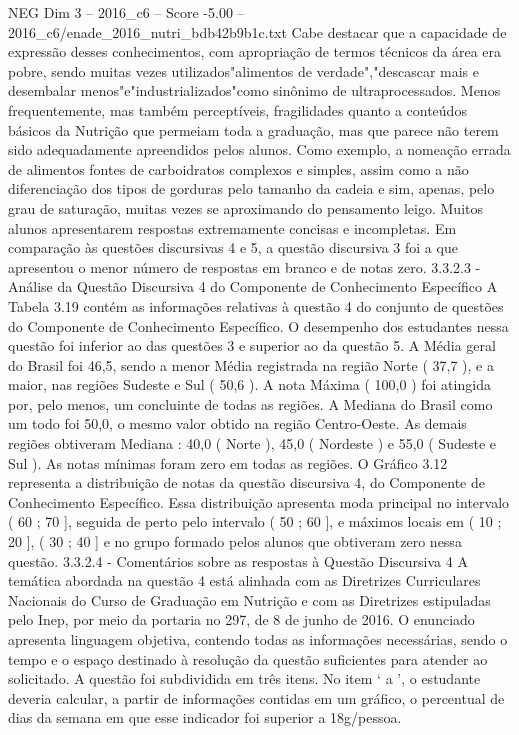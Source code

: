 \begin{textsample}{NEG Dim 3 – 2016\_c6 – Score -5.00 – 2016\_c6/enade\_2016\_nutri\_bdb42b9b1c.txt}
Cabe destacar que a capacidade de expressão desses conhecimentos, com apropriação de termos técnicos da área era pobre, sendo muitas vezes utilizados"alimentos de verdade","descascar mais e desembalar menos"e"industrializados"como sinônimo de ultraprocessados.
Menos frequentemente, mas também perceptíveis, fragilidades quanto a conteúdos básicos da Nutrição que permeiam toda a graduação, mas que parece não terem sido adequadamente apreendidos pelos alunos.
Como exemplo, a nomeação errada de alimentos fontes de carboidratos complexos e simples, assim como a não diferenciação dos tipos de gorduras pelo tamanho da cadeia e sim, apenas, pelo grau de saturação, muitas vezes se aproximando do pensamento leigo.
Muitos alunos apresentarem respostas extremamente concisas e incompletas.
Em comparação às questões discursivas 4 e 5, a questão discursiva 3 foi a que apresentou o menor número de respostas em branco e de notas zero. 3.3.2.3 - Análise da Questão Discursiva 4 do Componente de Conhecimento Específico A Tabela 3.19 contém as informações relativas à questão 4 do conjunto de questões do Componente de Conhecimento Específico.
O desempenho dos estudantes nessa questão foi inferior ao das questões 3 e superior ao da questão 5.
A Média geral do Brasil foi 46,5, sendo a menor Média registrada na região Norte ( 37,7 ), e a maior, nas regiões Sudeste e Sul ( 50,6 ).
A nota Máxima ( 100,0 ) foi atingida por, pelo menos, um concluinte de todas as regiões.
A Mediana do Brasil como um todo foi 50,0, o mesmo valor obtido na região Centro-Oeste.
As demais regiões obtiveram Mediana : 40,0 ( Norte ), 45,0 ( Nordeste ) e 55,0 ( Sudeste e Sul ).
As notas mínimas foram zero em todas as regiões.
O Gráfico 3.12 representa a distribuição de notas da questão discursiva 4, do Componente de Conhecimento Específico.
Essa distribuição apresenta moda principal no intervalo ( 60 ; 70 ], seguida de perto pelo intervalo ( 50 ; 60 ], e máximos locais em ( 10 ; 20 ], ( 30 ; 40 ] e no grupo formado pelos alunos que obtiveram zero nessa questão. 3.3.2.4 - Comentários sobre as respostas à Questão Discursiva 4 A temática abordada na questão 4 está alinhada com as Diretrizes Curriculares Nacionais do Curso de Graduação em Nutrição e com as Diretrizes estipuladas pelo Inep, por meio da portaria no 297, de 8 de junho de 2016.
O enunciado apresenta linguagem objetiva, contendo todas as informações necessárias, sendo o tempo e o espaço destinado à resolução da questão suficientes para atender ao solicitado.
A questão foi subdividida em três itens.
No item ‘ a ’, o estudante deveria calcular, a partir de informações contidas em um gráfico, o percentual de dias da semana em que esse indicador foi superior a 18g/pessoa.

\end{textsample}
